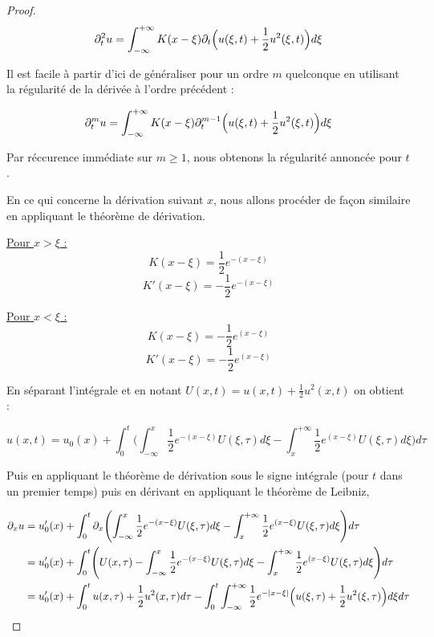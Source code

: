 \begin{proof}
    $$\partial_t^2 u = \int_{-\infty}^{+\infty} K(x-\xi) \partial_t\Bigl( u(\xi,t) + \frac{1}{2}u^2(\xi,t) \Bigr) d\xi$$

    Il est facile à partir d'ici de généraliser pour un ordre $m$ quelconque en utilisant la régularité de la dérivée à l'ordre précédent : 

    $$\partial_t^m u = \int_{-\infty}^{+\infty} K(x-\xi) \partial_t^{m-1}\Bigl( u(\xi,t) + \frac{1}{2}u^2(\xi,t) \Bigr) d\xi$$

    Par réccurence immédiate sur $m\geq 1$, nous obtenons la régularité annoncée pour $t$.


    En ce qui concerne la dérivation suivant $x$, nous allons procéder de façon similaire en appliquant le théorème de dérivation.


    \underline{Pour $x > \xi$ :} 
    $$K(x-\xi) = \frac{1}{2}e^{-(x - \xi)}$$
    $$K'(x-\xi) = -\frac{1}{2}e^{-(x - \xi)}$$

    \underline{Pour $x < \xi$ :} 
    $$K(x-\xi) = -\frac{1}{2}e^{(x - \xi)}$$
    $$K'(x-\xi) = -\frac{1}{2}e^{(x - \xi)}$$

    En séparant l'intégrale et en notant $U(x,t) = u(x,t) + \frac{1}{2} u^2(x,t)$ on obtient :

    $$u(x,t) = u_0(x) + \int_{0}^{t} \Biggl( \int_{-\infty}^{x} \frac{1}{2} e^{-(x - \xi)} U(\xi,\tau) d\xi - \int_{x}^{+\infty} \frac{1}{2} e^{(x - \xi)} U(\xi,\tau) d\xi \Biggr) d\tau$$

    Puis en appliquant le théorème de dérivation sous le signe intégrale (pour $t$ dans un premier temps) puis en dérivant en appliquant le théorème de Leibniz,

    
    \begin{equation*}
    \begin{split}
        \partial_x u &= u_0'(x) + \int_{0}^{t} \partial_x \Biggl( \int_{-\infty}^{x} \frac{1}{2} e^{-(x - \xi)} U(\xi,\tau) d\xi - \int_{x}^{+\infty} \frac{1}{2} e^{(x - \xi)} U(\xi,\tau) d\xi \Biggr) d\tau \\
        &= u_0'(x) +  \int_{0}^{t} \Biggl(U(x,\tau) - \int_{-\infty}^{x} \frac{1}{2} e^{-(x - \xi)} U(\xi,\tau) d\xi - \int_{x}^{+\infty} \frac{1}{2} e^{(x - \xi)} U(\xi,\tau) d\xi \Biggr) d\tau\\
        &= u_0'(x) + \int_{0}^{t} u(x,\tau) + \frac{1}{2} u^2(x,\tau) d\tau  - \int_{0}^{t} \int_{-\infty}^{+\infty} \frac{1}{2} e^{-|x - \xi|} \Bigl( u(\xi,\tau) + \frac{1}{2}u^2(\xi,\tau) \Bigr) d\xi d\tau \\
    \end{split}
    \end{equation*}


\end{proof}

